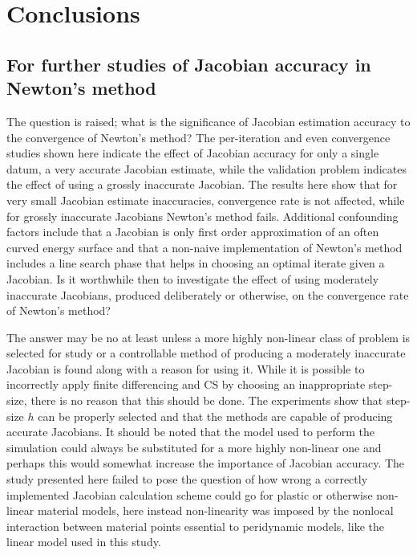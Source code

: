 \documentclass[preprint,12pt]{elsarticle}
\begin{document}
\section{Conclusions}
\label{sec:Conc}
%
\subsection{For further studies of Jacobian accuracy in Newton's method}
\label{subsec:FurtherStudies}
The question is raised; what is the significance of Jacobian estimation
accuracy to the convergence of Newton's method?  The per-iteration and even
convergence studies shown here indicate the effect of Jacobian accuracy for
only a single datum, a very accurate Jacobian estimate, while the validation
problem indicates the effect of using a grossly inaccurate Jacobian. The results here show that
for very small Jacobian estimate inaccuracies, convergence rate is not
affected, while for grossly inaccurate Jacobians Newton's method fails. 
Additional confounding factors include that a Jacobian is only first
order approximation of an often curved energy surface and that a non-naive implementation of Newton's
method includes a line search phase that helps in choosing an optimal iterate given a Jacobian.
Is it worthwhile then to investigate the effect of using moderately inaccurate Jacobians, 
produced deliberately or otherwise, on the convergence rate of Newton's method?

The answer may be no at least unless a more highly non-linear class of problem
is selected for study or a controllable method of producing a moderately
inaccurate Jacobian is found along with a reason for using it. While it is possible
to incorrectly apply finite differencing and CS by choosing an inappropriate
step-size, there is no reason that this should be done. The experiments show
that step-size $h$ can be properly selected and that the methods are capable of
producing accurate Jacobians. It should be noted that the model used to perform
the simulation could always be substituted for a more highly non-linear one and
perhaps this would somewhat increase the importance of Jacobian accuracy. The
study presented here failed to pose the question of how wrong a correctly
implemented Jacobian calculation scheme could go for plastic or otherwise
non-linear material models, here instead non-linearity was imposed by the
nonlocal interaction between material points essential to peridynamic models,
like the linear model used in this study. 
\end{document}
